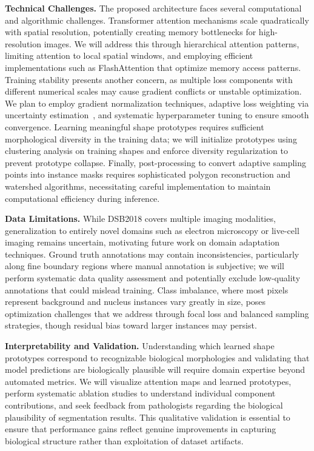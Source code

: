 \documentclass[acmlarge]{acmart}
\begin{document}
\textbf{Technical Challenges.} The proposed architecture faces several computational and algorithmic challenges. Transformer attention mechanisms scale quadratically with spatial resolution, potentially creating memory bottlenecks for high-resolution images. We will address this through hierarchical attention patterns, limiting attention to local spatial windows, and employing efficient implementations such as FlashAttention that optimize memory access patterns. Training stability presents another concern, as multiple loss components with different numerical scales may cause gradient conflicts or unstable optimization. We plan to employ gradient normalization techniques, adaptive loss weighting via uncertainty estimation~\cite{kendall2018multi}, and systematic hyperparameter tuning to ensure smooth convergence. Learning meaningful shape prototypes requires sufficient morphological diversity in the training data; we will initialize prototypes using clustering analysis on training shapes and enforce diversity regularization to prevent prototype collapse. Finally, post-processing to convert adaptive sampling points into instance masks requires sophisticated polygon reconstruction and watershed algorithms, necessitating careful implementation to maintain computational efficiency during inference.

\textbf{Data Limitations.} While DSB2018 covers multiple imaging modalities, generalization to entirely novel domains such as electron microscopy or live-cell imaging remains uncertain, motivating future work on domain adaptation techniques. Ground truth annotations may contain inconsistencies, particularly along fine boundary regions where manual annotation is subjective; we will perform systematic data quality assessment and potentially exclude low-quality annotations that could mislead training. Class imbalance, where most pixels represent background and nucleus instances vary greatly in size, poses optimization challenges that we address through focal loss and balanced sampling strategies, though residual bias toward larger instances may persist.

\textbf{Interpretability and Validation.} Understanding which learned shape prototypes correspond to recognizable biological morphologies and validating that model predictions are biologically plausible will require domain expertise beyond automated metrics. We will visualize attention maps and learned prototypes, perform systematic ablation studies to understand individual component contributions, and seek feedback from pathologists regarding the biological plausibility of segmentation results. This qualitative validation is essential to ensure that performance gains reflect genuine improvements in capturing biological structure rather than exploitation of dataset artifacts.
\end{document}

